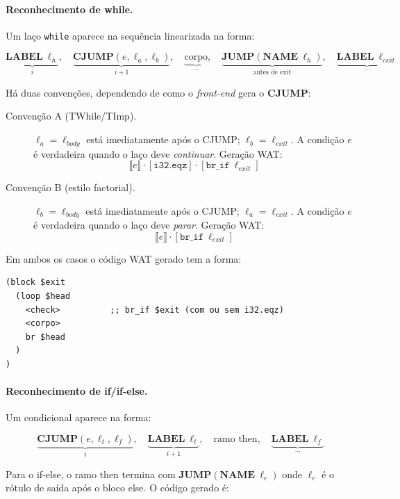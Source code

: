 \paragraph{Reconhecimento de while.}
Um laço \texttt{while} aparece na sequência linearizada na forma:

\[
  \underbrace{\mathbf{LABEL}\ \ell_h}_{i},\quad
  \underbrace{\mathbf{CJUMP}(e, \ell_a, \ell_b)}_{i+1},\quad
  \underbrace{\text{corpo}}_{\ldots},\quad
  \underbrace{\mathbf{JUMP}(\mathbf{NAME}\ \ell_h)}_{\text{antes de exit}},\quad
  \underbrace{\mathbf{LABEL}\ \ell_{\mathit{exit}}}_{\ldots}
\]

Há duas convenções, dependendo de como o \emph{front-end} gera o \textbf{CJUMP}:

\begin{description}
  \item[Convenção A (TWhile/TImp).] $\ell_a = \ell_{\mathit{body}}$ está
    imediatamente após o CJUMP; $\ell_b = \ell_{\mathit{exit}}$.  A condição
    $e$ é verdadeira quando o laço deve \emph{continuar}.  Geração WAT:
    \[
      \llbracket e \rrbracket \cdot [\mathtt{i32.eqz}] \cdot [\mathtt{br\_if}\ \ell_{\mathit{exit}}]
    \]
  \item[Convenção B (estilo factorial).] $\ell_b = \ell_{\mathit{body}}$ está
    imediatamente após o CJUMP; $\ell_a = \ell_{\mathit{exit}}$.  A condição
    $e$ é verdadeira quando o laço deve \emph{parar}.  Geração WAT:
    \[
      \llbracket e \rrbracket \cdot [\mathtt{br\_if}\ \ell_{\mathit{exit}}]
    \]
\end{description}

Em ambos os casos o código WAT gerado tem a forma:

\begin{verbatim}
(block $exit
  (loop $head
    <check>          ;; br_if $exit (com ou sem i32.eqz)
    <corpo>
    br $head
  )
)
\end{verbatim}

\paragraph{Reconhecimento de if/if-else.}
Um condicional aparece na forma:

\[
  \underbrace{\mathbf{CJUMP}(e, \ell_t, \ell_f)}_{i},\quad
  \underbrace{\mathbf{LABEL}\ \ell_t}_{i+1},\quad
  \text{ramo then},\quad
  \underbrace{\mathbf{LABEL}\ \ell_f}_{\ldots}
\]

Para o if-else, o ramo then termina com $\mathbf{JUMP}(\mathbf{NAME}\ \ell_e)$
onde $\ell_e$ é o rótulo de saída após o bloco else.  O código gerado é:

